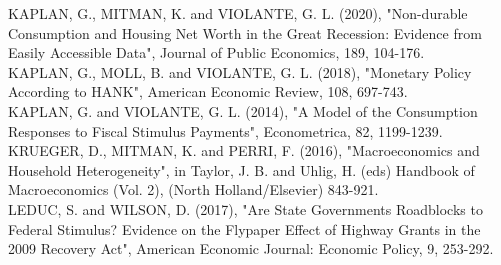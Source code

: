 \documentclass[10pt]{article}
\begin{document}
KAPLAN, G., MITMAN, K. and VIOLANTE, G. L. (2020), "Non-durable Consumption and Housing Net Worth in the Great Recession: Evidence from Easily Accessible Data", Journal of Public Economics, 189, 104-176.\\
KAPLAN, G., MOLL, B. and VIOLANTE, G. L. (2018), "Monetary Policy According to HANK", American Economic Review, 108, 697-743.\\
KAPLAN, G. and VIOLANTE, G. L. (2014), "A Model of the Consumption Responses to Fiscal Stimulus Payments", Econometrica, 82, 1199-1239.\\
KRUEGER, D., MITMAN, K. and PERRI, F. (2016), "Macroeconomics and Household Heterogeneity", in Taylor, J. B. and Uhlig, H. (eds) Handbook of Macroeconomics (Vol. 2), (North Holland/Elsevier) 843-921.\\
LEDUC, S. and WILSON, D. (2017), "Are State Governments Roadblocks to Federal Stimulus? Evidence on the Flypaper Effect of Highway Grants in the 2009 Recovery Act", American Economic Journal: Economic Policy, 9, 253-292.
\end{document}

